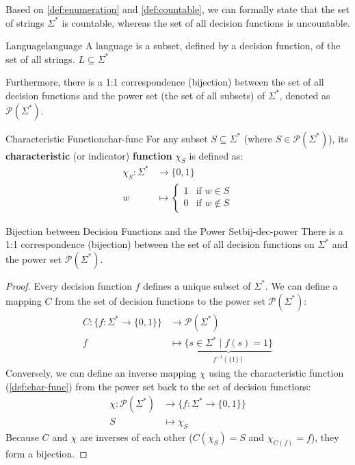 \noindent Based on \cref{def:enumeration} and \cref{def:countable}, we can formally state that the set of strings \(\Sigma^*\) is countable, whereas the set of all decision functions is uncountable.
\begin{definition}{Language}{language}
    A language is a subset, defined by a decision function, of the set of all strings. \(L\subseteq\Sigma^*\) 
\end{definition}
\noindent Furthermore, there is a 1:1 correspondence (bijection) between the set of all decision functions and the power set (the set of all subsets) of \(\Sigma^*\), denoted as \(\mathcal{P}(\Sigma^*)\). 

\begin{definition}{Characteristic Function}{char-func}
    For any subset \(S \subseteq \Sigma^*\) (where \(S \in \mathcal{P}(\Sigma^*)\)), its \textbf{characteristic} (or indicator) \textbf{function} \(\chi_S\) is defined as:
    \[
    \begin{aligned}
        \chi_{S}: \Sigma^* &\rightarrow \{0,1\}\\
        w &\mapsto \begin{cases}
            1 & \text{if } w \in S\\
            0 & \text{if } w \notin S
        \end{cases}
    \end{aligned}
    \]
\end{definition}

\begin{theorem}{Bijection between Decision Functions and the Power Set}{bij-dec-power}
    There is a 1:1 correspondence (bijection) between the set of all decision functions on \(\Sigma^*\) and the power set \(\mathcal{P}(\Sigma^*)\).
    \begin{proof}
        Every decision function \(f\) defines a unique subset of \(\Sigma^*\). We can define a mapping \(C\) from the set of decision functions to the power set \(\mathcal{P}(\Sigma^*)\):
        \[
        \begin{aligned}
            C: \{f : \Sigma^* \rightarrow \{0,1\}\} &\rightarrow \mathcal{P}(\Sigma^*)\\
            f &\mapsto \underbrace{\{s \in \Sigma^* \mid f(s) = 1\}}_{f^{-1}(\{1\})}
        \end{aligned}
        \]
        Conversely, we can define an inverse mapping \(\chi\) using the characteristic function (\cref{def:char-func}) from the power set back to the set of decision functions:
        \[
        \begin{aligned}
            \chi: \mathcal{P}(\Sigma^*) &\rightarrow \{f : \Sigma^* \rightarrow \{0,1\}\}\\
            S &\mapsto \chi_S
        \end{aligned}
        \]
        Because \(C\) and \(\chi\) are inverses of each other (\(C(\chi_S) = S\) and \(\chi_{C(f)} = f\)), they form a bijection. 
    \end{proof}
\end{theorem}

